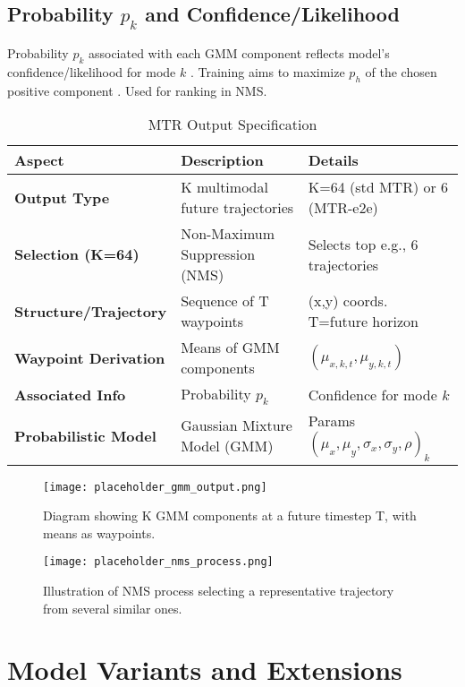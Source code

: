 \subsection{Probability $p_k$ and Confidence/Likelihood}
Probability $p_k$ associated with each GMM component reflects model's confidence/likelihood for mode $k$ \cite{Shi2022MTR, Chai2019MultiPath}. Training aims to maximize $p_h$ of the chosen positive component \cite{Shi2022MTR}. Used for ranking in NMS.

\begin{table}[h!]
    \centering
    \caption{MTR Output Specification}
    \label{tab:output_spec}
    \begin{tabular}{@{}lll@{}}
        \toprule
        Aspect & Description & Details \\
        \midrule
        \textbf{Output Type} & K multimodal future trajectories & K=64 (std MTR) or 6 (MTR-e2e) \\
        \textbf{Selection (K=64)} & Non-Maximum Suppression (NMS) & Selects top e.g., 6 trajectories \\
        \textbf{Structure/Trajectory} & Sequence of T waypoints & (x,y) coords. T=future horizon \\
        \textbf{Waypoint Derivation} & Means of GMM components & $(\mu_{x,k,t}, \mu_{y,k,t})$ \\
        \textbf{Associated Info} & Probability $p_k$ & Confidence for mode $k$ \\
        \textbf{Probabilistic Model} & Gaussian Mixture Model (GMM) & Params $(\mu_x, \mu_y, \sigma_x, \sigma_y, \rho)_k$ \\
        \bottomrule
    \end{tabular}
\end{table}

\begin{figure}[h!]
    \centering
    \texttt{[image: placeholder\_gmm\_output.png]} 
    \caption{Diagram showing K GMM components at a future timestep T, with means as waypoints.}
    \label{fig:gmm_output}
\end{figure}
\begin{figure}[h!]
    \centering
    \texttt{[image: placeholder\_nms\_process.png]} 
    \caption{Illustration of NMS process selecting a representative trajectory from several similar ones.}
    \label{fig:nms_process}
\end{figure}

\section{Model Variants and Extensions}
\label{sec:model_variants}

